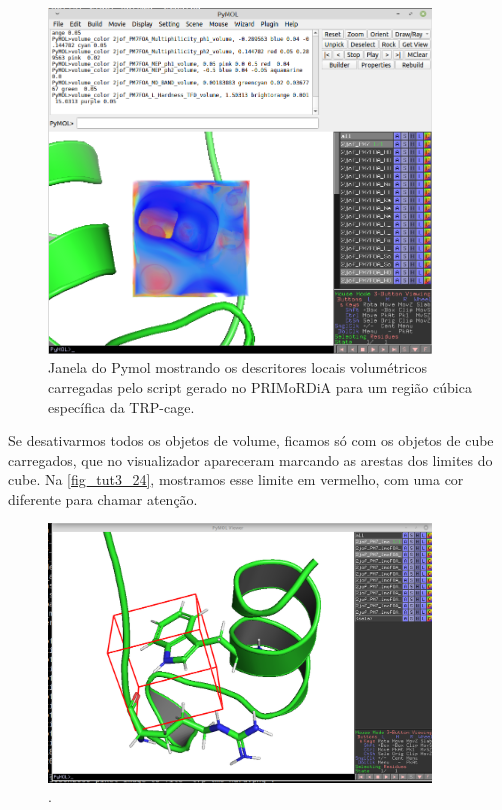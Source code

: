 \documentclass[a4paper,11pt]{refart}
\begin{document}
\hspace*{-\leftmarginwidth}
\begin{minipage}{\fullwidth}
	\begin{figure}[H]
		\begin{center}
			\includegraphics[width=4in]{images/tut3_img24}
			\caption{Janela do Pymol mostrando os descritores locais volumétricos carregadas pelo script gerado no PRIMoRDiA para um região cúbica específica da TRP-cage.}
			\label{fig_tut3_23}
		\end{center}
	\end{figure}
\end{minipage}

Se desativarmos todos os objetos de volume, ficamos só com os objetos de cube carregados, que no visualizador apareceram marcando as arestas dos limites do cube. Na \autoref{fig_tut3_24}, mostramos esse limite em vermelho, com uma cor diferente para chamar atenção. 

\hspace*{-\leftmarginwidth}
\begin{minipage}{\fullwidth}
	\begin{figure}[H]
		\begin{center}
			\includegraphics[width=4in]{images/tut3_img25}
			\caption{.}
			\label{fig_tut3_24}
		\end{center}
	\end{figure}
\end{minipage}
\end{document}
